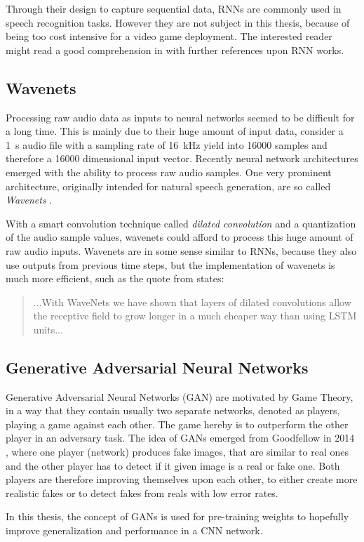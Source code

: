 Through their design to capture sequential data, RNNs are commonly used in speech recognition tasks.
However they are not subject in this thesis, because of being too cost intensive for a video game deployment.
The interested reader might read a good comprehension in \cite{Staudenmeyer2019} with further references upon RNN works.



\subsection{Wavenets}\label{sec:prev_nn_wavenet}
Processing raw audio data as inputs to neural networks seemed to be difficult for a long time.
This is mainly due to their huge amount of input data, consider a \SI{1}{\second} audio file with a sampling rate of \SI{16}{\kilo\hertz} yield into 16000 samples and therefore a 16000 dimensional input vector.
Recently neural network architectures emerged with the ability to process raw audio samples.
One very prominent architecture, originally intended for natural speech generation, are so called \emph{Wavenets} \cite{Oord2016}.

With a smart convolution technique called \emph{dilated convolution} and a quantization of the audio sample values, wavenets could afford to process this huge amount of raw audio inputs.
Wavenets are in some sense similar to RNNs, because they also use outputs from previous time steps, but the implementation of wavenets is much more efficient, such as the quote from \cite{Oord2016} states:
\begin{quote}
  ...With WaveNets we have shown that layers of dilated convolutions allow the receptive field to grow longer in a much cheaper way than using LSTM units...
\end{quote}



\subsection{Generative Adversarial Neural Networks}\label{sec:prev_nn_adv}
Generative Adversarial Neural Networks (GAN) are motivated by Game Theory, in a way that they contain usually two separate networks, denoted as players, playing a game against each other.
The game hereby is to outperform the other player in an adversary task.
The idea of GANs emerged from Goodfellow in 2014 \cite{Goodfellow2014}, where one player (network) produces fake images, that are similar to real ones and the other player has to detect if it given image is a real or fake one.
Both players are therefore improving themselves upon each other, to either create more realistic fakes or to detect fakes from reals with low error rates.

In this thesis, the concept of GANs is used for pre-training weights to hopefully improve generalization and performance in a CNN network.